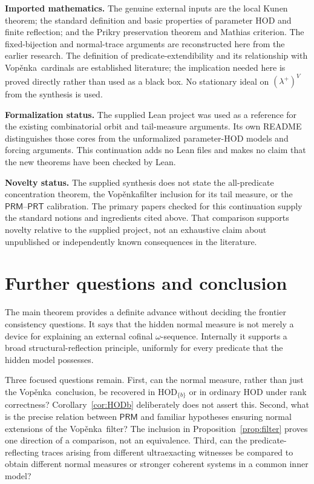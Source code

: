 \documentclass[11pt,letterpaper]{article}
\theoremstyle{definition}
\numberwithin{equation}{section}
\newcommand{\HOD}{\mathrm{HOD}}
\newcommand{\PRM}{\mathsf{PRM}}
\newcommand{\PRT}{\mathsf{PRT}}
\newcommand{\Vop}{Vop\v{e}nka}
\begin{document}
\textbf{Imported mathematics.} The genuine external inputs are the local Kunen theorem; the standard definition and basic properties of parameter HOD and finite reflection; and the Prikry preservation theorem and Mathias criterion. The fixed-bijection and normal-trace arguments are reconstructed here from the earlier research. The definition of predicate-extendibility and its relationship with \Vop\ cardinals are established literature; the implication needed here is proved directly rather than used as a black box. No stationary ideal on $(\lambda^+)^V$ from the synthesis is used.

\textbf{Formalization status.} The supplied Lean project was used as a reference for the existing combinatorial orbit and tail-measure arguments. Its own README distinguishes those cores from the unformalized parameter-HOD models and forcing arguments. This continuation adds no Lean files and makes no claim that the new theorems have been checked by Lean.

\textbf{Novelty status.} The supplied synthesis does not state the all-predicate concentration theorem, the \Vop\-filter inclusion for its tail measure, or the $\PRM$--$\PRT$ calibration. The primary papers checked for this continuation supply the standard notions and ingredients cited above. That comparison supports novelty relative to the supplied project, not an exhaustive claim about unpublished or independently known consequences in the literature.

\section{Further questions and conclusion}\label{sec:questions}

The main theorem provides a definite advance without deciding the frontier consistency questions. It says that the hidden normal measure is not merely a device for explaining an external cofinal $\omega$-sequence. Internally it supports a broad structural-reflection principle, uniformly for every predicate that the hidden model possesses.

Three focused questions remain. First, can the normal measure, rather than just the \Vop\ conclusion, be recovered in $\HOD_{\{b\}}$ or in ordinary HOD under rank correctness? Corollary~\ref{cor:HODb} deliberately does not assert this. Second, what is the precise relation between $\PRM$ and familiar hypotheses ensuring normal extensions of the \Vop\ filter? The inclusion in Proposition~\ref{prop:filter} proves one direction of a comparison, not an equivalence. Third, can the predicate-reflecting traces arising from different ultraexacting witnesses be compared to obtain different normal measures or stronger coherent systems in a common inner model?
\end{document}
